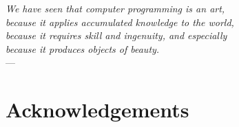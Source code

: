 

\begin{flushright}{\slshape    
We have seen that computer programming is an art, \\ 
because it applies accumulated knowledge to the world, \\ 
because it requires skill and ingenuity, and especially \\
because it produces objects of beauty.} \\ \medskip
---  \citep{knuth:1974}
\end{flushright}

\bigskip


\begingroup

\let\clearpage\relax
\let\cleardoublepage\relax
\let\cleardoublepage\relax

\chapter*{Acknowledgements} %


%
%
%
%

\endgroup
